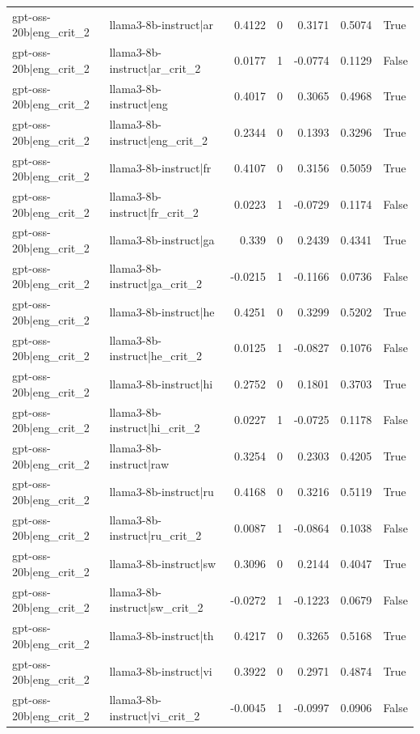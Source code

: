 \begin{table}
\begin{tabular}{l l r r r r l}
gpt-oss-20b|eng_crit_2 & llama3-8b-instruct|ar & 0.4122 & 0 & 0.3171 & 0.5074 & True \\
gpt-oss-20b|eng_crit_2 & llama3-8b-instruct|ar_crit_2 & 0.0177 & 1 & -0.0774 & 0.1129 & False \\
gpt-oss-20b|eng_crit_2 & llama3-8b-instruct|eng & 0.4017 & 0 & 0.3065 & 0.4968 & True \\
gpt-oss-20b|eng_crit_2 & llama3-8b-instruct|eng_crit_2 & 0.2344 & 0 & 0.1393 & 0.3296 & True \\
gpt-oss-20b|eng_crit_2 & llama3-8b-instruct|fr & 0.4107 & 0 & 0.3156 & 0.5059 & True \\
gpt-oss-20b|eng_crit_2 & llama3-8b-instruct|fr_crit_2 & 0.0223 & 1 & -0.0729 & 0.1174 & False \\
gpt-oss-20b|eng_crit_2 & llama3-8b-instruct|ga & 0.339 & 0 & 0.2439 & 0.4341 & True \\
gpt-oss-20b|eng_crit_2 & llama3-8b-instruct|ga_crit_2 & -0.0215 & 1 & -0.1166 & 0.0736 & False \\
gpt-oss-20b|eng_crit_2 & llama3-8b-instruct|he & 0.4251 & 0 & 0.3299 & 0.5202 & True \\
gpt-oss-20b|eng_crit_2 & llama3-8b-instruct|he_crit_2 & 0.0125 & 1 & -0.0827 & 0.1076 & False \\
gpt-oss-20b|eng_crit_2 & llama3-8b-instruct|hi & 0.2752 & 0 & 0.1801 & 0.3703 & True \\
gpt-oss-20b|eng_crit_2 & llama3-8b-instruct|hi_crit_2 & 0.0227 & 1 & -0.0725 & 0.1178 & False \\
gpt-oss-20b|eng_crit_2 & llama3-8b-instruct|raw & 0.3254 & 0 & 0.2303 & 0.4205 & True \\
gpt-oss-20b|eng_crit_2 & llama3-8b-instruct|ru & 0.4168 & 0 & 0.3216 & 0.5119 & True \\
gpt-oss-20b|eng_crit_2 & llama3-8b-instruct|ru_crit_2 & 0.0087 & 1 & -0.0864 & 0.1038 & False \\
gpt-oss-20b|eng_crit_2 & llama3-8b-instruct|sw & 0.3096 & 0 & 0.2144 & 0.4047 & True \\
gpt-oss-20b|eng_crit_2 & llama3-8b-instruct|sw_crit_2 & -0.0272 & 1 & -0.1223 & 0.0679 & False \\
gpt-oss-20b|eng_crit_2 & llama3-8b-instruct|th & 0.4217 & 0 & 0.3265 & 0.5168 & True \\
gpt-oss-20b|eng_crit_2 & llama3-8b-instruct|vi & 0.3922 & 0 & 0.2971 & 0.4874 & True \\
gpt-oss-20b|eng_crit_2 & llama3-8b-instruct|vi_crit_2 & -0.0045 & 1 & -0.0997 & 0.0906 & False \\

\end{tabular}
\end{table}
